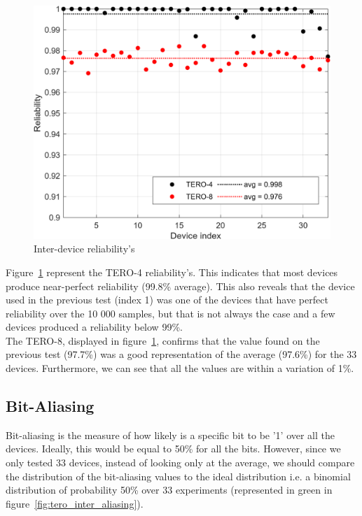 \begin{figure}[H]
    \centering \includegraphics[width=0.8\linewidth]{images/tero_inter_reliabilities.png}
    \caption{Inter-device reliability's}
    \label{fig:tero_inter_reliabilities}
\end{figure}

Figure~\ref{fig:tero_inter_reliabilities} represent the TERO-4 reliability's. This indicates that most devices produce near-perfect reliability (99.8\% average). This also reveals that the device used in the previous test (index 1) was one of the devices that have perfect reliability over the 10 000 samples, but that is not always the case and a few devices produced a reliability below 99\%.\\


The TERO-8, displayed in figure~\ref{fig:tero_inter_reliabilities}, confirms that the value found on the previous test (97.7\%) was a good representation of the average (97.6\%) for the 33 devices. Furthermore, we can see that all the values are within a variation of 1\%.


\subsection{Bit-Aliasing}

Bit-aliasing is the measure of how likely is a specific bit to be '1' over all the devices. Ideally, this would be equal to 50\% for all the bits. However, since we only tested 33 devices, instead of looking only at the average, we should compare the distribution of the bit-aliasing values to the ideal distribution i.e. a binomial distribution of probability 50\% over 33 experiments (represented in green in figure~\ref{fig:tero_inter_aliasing}).

